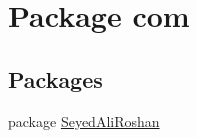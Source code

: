 \hypertarget{namespacecom}{}\section{Package com}
\label{namespacecom}
\subsection*{Packages}
\begin{DoxyCompactItemize}
\item 
package \hyperlink{namespacecom_1_1_seyed_ali_roshan}{Seyed\+Ali\+Roshan}
\end{DoxyCompactItemize}
